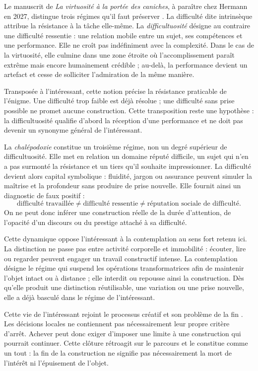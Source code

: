 \documentclass[11pt,a4paper]{article}
\begin{document}
Le manuscrit de \emph{La virtuosité à la portée des caniches}, à paraître chez
Hermann en 2027, distingue trois régimes qu'il faut préserver
\parencite[manuscrit, 13--16]{pachet2027virtuosite}. La difficulté dite
intrinsèque attribue la résistance à la tâche elle-même. La
\emph{difficultuosité} désigne au contraire une difficulté ressentie : une
relation mobile entre un sujet, ses compétences et une performance. Elle ne
croît pas indéfiniment avec la complexité. Dans le cas de la virtuosité, elle
culmine dans une zone étroite où l'accomplissement paraît extrême mais encore
humainement crédible ; au-delà, la performance devient un artefact et cesse de
solliciter l'admiration de la même manière.

Transposée à l'intéressant, cette notion précise la résistance praticable de
l'énigme. Une difficulté trop faible est déjà résolue ; une difficulté sans
prise possible ne promet aucune construction. Cette transposition reste une
hypothèse : la difficultuosité qualifie d'abord la réception d'une performance
et ne doit pas devenir un synonyme général de l'intéressant.

La \emph{chalépodoxie} constitue un troisième régime, non un degré supérieur de
difficultuosité. Elle met en relation un domaine réputé difficile, un sujet qui
n'en a pas surmonté la résistance et un tiers qu'il souhaite impressionner. La
difficulté devient alors capital symbolique : fluidité, jargon ou assurance
peuvent simuler la maîtrise et la profondeur sans produire de prise nouvelle.
Elle fournit ainsi un diagnostic de faux positif :
\[
  \text{difficulté travaillée}
  \neq \text{difficulté ressentie}
  \neq \text{réputation sociale de difficulté}.
\]
On ne peut donc inférer une construction réelle de la durée d'attention, de
l'opacité d'un discours ou du prestige attaché à sa difficulté.

Cette dynamique oppose l'intéressant à la contemplation au sens fort retenu ici.
La distinction ne passe pas entre activité corporelle et immobilité : écouter,
lire ou regarder peuvent engager un travail constructif intense. La contemplation
désigne le régime qui suspend les opérations transformatrices afin de maintenir
l'objet intact ou à distance ; elle interdit ou repousse ainsi la construction.
Dès qu'elle produit une distinction réutilisable, une variation ou une prise
nouvelle, elle a déjà basculé dans le régime de l'intéressant.

Cette vie de l'intéressant rejoint le processus créatif et son problème de la
fin \parencite{pachet2026impossibilite}. Les décisions locales ne contiennent
pas nécessairement leur propre critère d'arrêt. Achever peut donc exiger
d'imposer une limite à une construction qui pourrait continuer. Cette clôture
rétroagit sur le parcours et le constitue comme un tout : la fin de la
construction ne signifie pas nécessairement la mort de l'intérêt ni
l'épuisement de l'objet.
\end{document}
